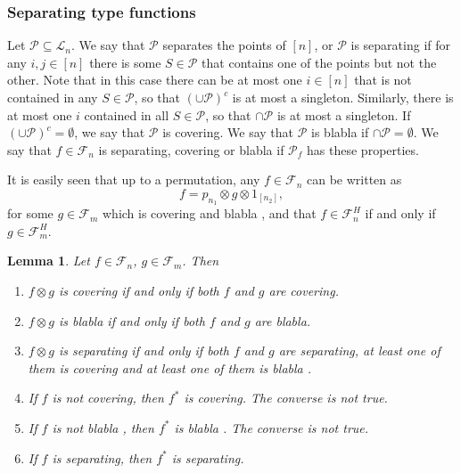 \documentclass[12pt]{article}
\newtheorem{lemma}{Lemma}
\theoremstyle{definition}
\theoremstyle{remark}
\def\blabla{blabla }
\def\Pe{\mathcal P}
\def\Fe{\mathcal F}
\begin{document}
\subsubsection{Separating type functions}



Let $\Pe\subseteq \mathcal L_n$. We say that $\Pe$ separates the points of $[n]$, or $\Pe$
is separating if for any
$i,j\in [n]$ there is some $S\in \Pe$ that contains one of the points but not the other. 
Note that in this case there can be at most one $i\in [n]$ that is not contained in any
$S\in \Pe$, so that $(\cup \Pe)^c$ is at most a singleton. Similarly, there is at most one
$i$ contained in all $S\in \Pe$, so that $\cap \Pe$ is at most a singleton. If $(\cup
\Pe)^c=\emptyset$, we say that $\Pe$ is covering.  We say that $\Pe$ is \blabla if $\cap
\Pe=\emptyset$.
We say that $f\in \Fe_n$ is
separating, covering or \blabla if $\Pe_f$ has these properties.

It is easily seen that up to a permutation, any $f\in \Fe_n$ can be written as
\[
f=p_{n_1}\otimes g\otimes 1_{[n_2]},
\]
for some $g\in \Fe_m$ which is covering and \blabla, and  that $f\in \Fe_n^H$ if and only if $g\in \Fe_m^H$. 

\begin{lemma}\label{lemma:cov_bla_sep}
Let $f\in \Fe_n$, $g\in \Fe_m$. Then
\begin{enumerate}
\item[(i)] $f\otimes g$ is covering if and only if both $f$ and $g$ are covering.
\item[(ii)] $f\otimes g$ is \blabla if and only if both $f$ and $g$ are blabla.
\item[(iii)] $f\otimes g$ is separating if and only if both $f$ and $g$ are separating,
at least one  of them is covering and at least one of them is \blabla. 
\item[(iv)] If $f$ is not covering, then $f^*$ is covering. The converse is not true.
\item[(v)] If $f$ is not \blabla, then $f^*$ is \blabla. The converse is not true.
\item[(vi)] If $f$ is separating, then $f^*$ is separating.

\end{enumerate}



\end{lemma}
\end{document}
